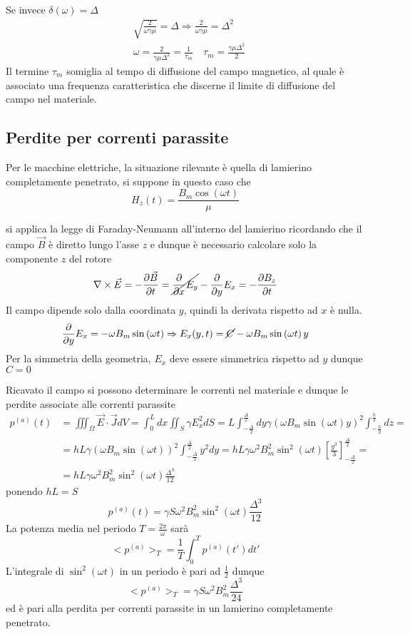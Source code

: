 Se invece $\delta(\omega) = \Delta$
$$\begin{aligned}
&\sqrt{\frac{2}{\omega\gamma\mu}} = \Delta \Rightarrow \frac{2}{\omega\gamma\mu} = \Delta^2\\
&\omega = \frac{2}{\gamma\mu\Delta^2} = \frac{1}{\tau_m}\quad \tau_m = \frac{\gamma\mu\Delta^2}{2}
\end{aligned}
$$
Il termine $\tau_m$ somiglia al tempo di diffusione del campo magnetico, al quale è associato una frequenza 
caratteristica che discerne il limite di diffusione del campo nel materiale.
\newpage
\subsection{Perdite per correnti parassite}
Per le macchine elettriche, la situazione rilevante è quella di lamierino completamente penetrato,
si suppone in questo caso che 
$$
H_z(t) = \frac{B_m \cos(\omega t)}{\mu}
$$

si applica la legge di Faraday-Neumann all'interno del lamierino ricordando che il campo $\vec{B}$ 
è diretto lungo l'asse $z$ e dunque è necessario calcolare solo la componente $z$ del rotore
$$
\nabla\times\vec{E} = -\frac{\partial\vec{B}}{\partial t} = \cancel{\frac{\partial}{\partial x}E_y} - \frac{\partial}{\partial y}E_x = -\frac{\partial B_z}{\partial t}
$$
Il campo dipende solo dalla coordinata $y$, quindi la derivata rispetto ad $x$ è nulla.
$$
\frac{\partial}{\partial y}E_x = -\omega B_m\sin\left(\omega t\right) \Rightarrow E_x(y,t) = \cancel{C}-\omega B_m\sin\left(\omega t\right)y
$$
Per la simmetria della geometria, $E_x$ deve essere simmetrica rispetto ad $y$ dunque $C=0$

Ricavato il campo si possono determinare le correnti nel materiale e dunque le perdite associate alle correnti 
parassite
$$\begin{aligned}
p^{(a)}(t) &= \iiint_\Omega \vec{E}\cdot\vec{J} dV = \int_0^L dx \iint_S \gamma E_x^2 dS = L\int_{-\frac{\Delta}{2}}^{\frac{\Delta}{2}} dy \gamma \left(\omega B_m \sin\left(\omega t\right)y\right)^2\int_{-\frac{h}{2}}^{\frac{h}{2}}dz=\\
&= hL\gamma\left(\omega B_m\sin\left(\omega t\right)\right)^2\int_{-\frac{\Delta}{2}}^{\frac{\Delta}{2}}y^2 dy=
hL\gamma\omega^2B_m^2\sin^2\left(\omega t\right)\left[\frac{y^3}{3}\right]_{-\frac{\Delta}{2}}^{\frac{\Delta}{2}} =\\
&= hL\gamma\omega^2B_m^2\sin^2\left(\omega t\right) \frac{\Delta^3}{12}
\end{aligned}
$$
ponendo $hL = S$ 
$$
p^{(a)}(t) = \gamma S \omega^2B_m^2\sin^2\left(\omega t\right)\frac{\Delta^3}{12}
$$
La potenza media nel periodo $T = \frac{2\pi}{\omega}$ sarà
$$
<p^{(a)}>_T = \frac{1}{T}\int_0^T p^{(a)}(t')dt'
$$
L'integrale di $\sin^2(\omega t)$ in un periodo è pari ad $\frac{1}{2}$ dunque
$$
<p^{(a)}>_T = \gamma S\omega^2B_m^2\frac{\Delta^3}{24}
$$
ed è pari alla perdita per correnti parassite in un lamierino completamente penetrato.

